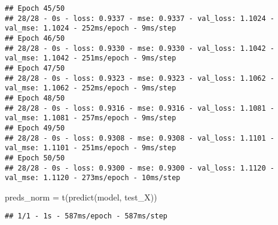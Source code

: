 \documentclass[
]{article}
\newenvironment{Shaded}{\begin{snugshade}}{\end{snugshade}}
\newcommand{\AttributeTok}[1]{\textcolor[rgb]{0.77,0.63,0.00}{#1}}
\newcommand{\CommentTok}[1]{\textcolor[rgb]{0.56,0.35,0.01}{\textit{#1}}}
\newcommand{\DecValTok}[1]{\textcolor[rgb]{0.00,0.00,0.81}{#1}}
\newcommand{\FunctionTok}[1]{\textcolor[rgb]{0.00,0.00,0.00}{#1}}
\newcommand{\NormalTok}[1]{#1}
\newcommand{\OtherTok}[1]{\textcolor[rgb]{0.56,0.35,0.01}{#1}}
\newcommand{\SpecialCharTok}[1]{\textcolor[rgb]{0.00,0.00,0.00}{#1}}
\begin{document}
\begin{verbatim}
## Epoch 45/50
## 28/28 - 0s - loss: 0.9337 - mse: 0.9337 - val_loss: 1.1024 - val_mse: 1.1024 - 252ms/epoch - 9ms/step
## Epoch 46/50
## 28/28 - 0s - loss: 0.9330 - mse: 0.9330 - val_loss: 1.1042 - val_mse: 1.1042 - 251ms/epoch - 9ms/step
## Epoch 47/50
## 28/28 - 0s - loss: 0.9323 - mse: 0.9323 - val_loss: 1.1062 - val_mse: 1.1062 - 252ms/epoch - 9ms/step
## Epoch 48/50
## 28/28 - 0s - loss: 0.9316 - mse: 0.9316 - val_loss: 1.1081 - val_mse: 1.1081 - 257ms/epoch - 9ms/step
## Epoch 49/50
## 28/28 - 0s - loss: 0.9308 - mse: 0.9308 - val_loss: 1.1101 - val_mse: 1.1101 - 251ms/epoch - 9ms/step
## Epoch 50/50
## 28/28 - 0s - loss: 0.9300 - mse: 0.9300 - val_loss: 1.1120 - val_mse: 1.1120 - 273ms/epoch - 10ms/step
\end{verbatim}

\begin{Shaded}
\begin{Highlighting}[]
\NormalTok{preds\_norm }\OtherTok{=} \FunctionTok{t}\NormalTok{(}\FunctionTok{predict}\NormalTok{(model, test\_X))}
\end{Highlighting}
\end{Shaded}

\begin{verbatim}
## 1/1 - 1s - 587ms/epoch - 587ms/step
\end{verbatim}

\begin{Shaded}
\end{Shaded}
\end{document}
